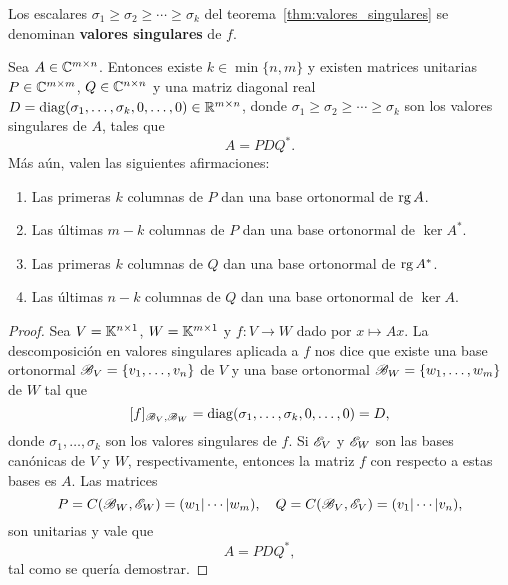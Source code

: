 \begin{block}
    Los escalares $\sigma_1\geq\sigma_2\geq\cdots\geq\sigma_k$ del
    teorema~\ref{thm:valores_singulares} se denominan \textbf{valores
    singulares} de $f$.
\end{block}

\begin{cor}
    Sea $A\in\mathbb{C}^{m\times n}$. Entonces existe $k\in\min\{n,m\}$ y existen
    matrices unitarias $P\in\mathbb{C}^{m\times m}$, $Q\in\mathbb{C}^{n\times n}$ y una matriz
    diagonal real $D=\operatorname{diag}(\sigma_1,\dots,\sigma_k,0,\dots,0)\in\mathbb{R}^{m\times n}$, donde
    $\sigma_1\geq\sigma_2\geq\cdots\geq\sigma_k$ son los valores singulares de
    $A$, tales que 
    \[
    A=PDQ^*.
    \]
    Más aún, valen las siguientes afirmaciones:
    \begin{enumerate}
        \item Las primeras $k$ columnas de $P$ dan una base ortonormal de $\operatorname{rg}
            A$.
        \item Las últimas $m-k$ columnas de $P$ dan una base ortonormal de
            $\ker A^*$.
        \item Las primeras $k$ columnas de $Q$ dan una base ortonormal de $\operatorname{rg}
            A^*$.
        \item Las últimas $n-k$ columnas de $Q$ dan una base ortonormal de
            $\ker A$.
    \end{enumerate}

	\begin{proof}
		Sea $V=\mathbb{K}^{n\times1}$, $W=\mathbb{K}^{m\times 1}$ y $f\colon V\to W$ dado por
		$x\mapsto Ax$. La descomposición en valores singulares aplicada a $f$
		nos dice que existe una base ortonormal $\mathscr{B}_V=\{v_1,\dots,v_n\}$ de
		$V$ y una base ortonormal $\mathscr{B}_W=\{w_1,\dots,w_m\}$ de $W$ tal que
		\[
		[f]_{\mathscr{B}_V,\mathscr{B}_W}=\operatorname{diag}(\sigma_1,\dots,\sigma_k,0,\dots,0)=D,
		\]
		donde $\sigma_1,\dots,\sigma_k$ son los valores singulares de $f$. Si
		$\mathscr{E}_V$ y $\mathscr{E}_W$ son las bases canónicas de $V$ y $W$,
		respectivamente, entonces la matriz $f$ con respecto a estas bases es
		$A$. Las matrices  
		\[
		P=C(\mathscr{B}_W,\mathscr{E}_W)=(w_1|\cdots|w_m),
		\quad
		Q=C(\mathscr{B}_V,\mathscr{E}_V)=(v_1|\cdots|v_n),
		\]
		son unitarias y vale que 
		\[
		A=PDQ^*,
		\]
		tal como se quería demostrar.
	\end{proof}
\end{cor}

